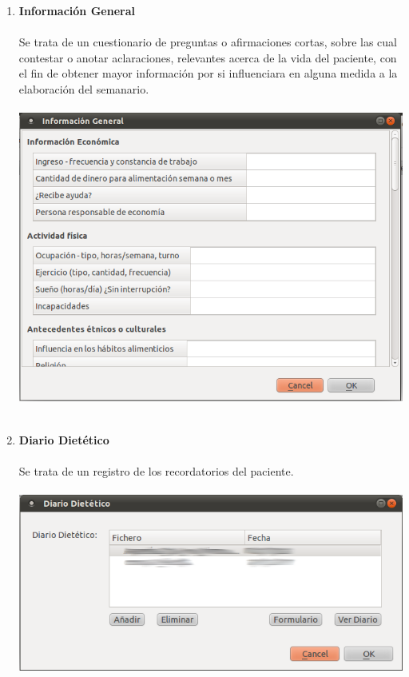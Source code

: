 \documentclass[12pt, spanish]{article}
\begin{document}
\begin{enumerate}
\item \textbf{Información General}\\\\
Se trata de un cuestionario de preguntas o afirmaciones cortas, sobre las cual contestar o anotar aclaraciones, relevantes acerca de la vida del paciente, con el fin de obtener mayor información por si influenciara en alguna medida a la elaboración del semanario.\\\\
\includegraphics[scale=0.5]{Image/infogen.png}\\\\
\item \textbf{Diario Dietético}\\\\
Se trata de un registro de los recordatorios del paciente.\\\\
\includegraphics[scale=0.5]{Image/diariodiet.png}\\\\

\end{enumerate}
\end{document}
